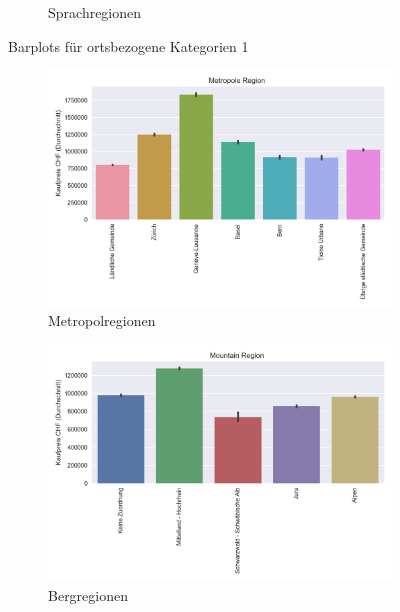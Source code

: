 \begin{figure}[h]
\begin{subfigure}{.5\textwidth}
  \caption{Sprachregionen} 
\end{subfigure}
\caption{Barplots für ortsbezogene Kategorien 1}
\end{figure}

\begin{figure}[h]
\begin{subfigure}{.5\textwidth}
  \centering
  \includegraphics[width=\linewidth]{images/anhang/analysis/barplot_metropole_region_id.png}
  \caption{Metropolregionen}
\end{subfigure}
\begin{subfigure}{.5\textwidth}
  \centering
  \includegraphics[width=\linewidth]{images/anhang/analysis/barplot_mountain_region_id.png}
  \caption{Bergregionen} 
\end{subfigure}
\begin{subfigure}{.5\textwidth}
  \centering

\end{subfigure}
\end{figure}
